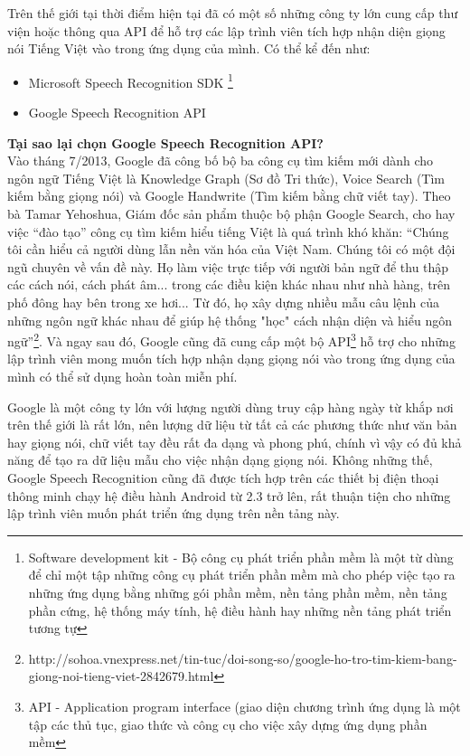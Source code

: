 \documentclass[12pt]{report}
\begin{document}
Trên thế giới tại thời điểm hiện tại đã có một số những công ty lớn cung cấp thư viện hoặc thông qua API để hỗ trợ các lập trình viên tích hợp nhận diện giọng nói Tiếng Việt vào trong ứng dụng của mình. Có thể kể đến như:

\begin{itemize}
	\item Microsoft Speech Recognition SDK \footnote{Software development kit - Bộ công cụ phát triển phần mềm là một từ dùng để chỉ một tập những công cụ phát triển phần mềm mà cho phép việc tạo ra những ứng dụng bằng những gói phần mềm, nền tảng phần mềm, nền tảng phần cứng, hệ thống máy tính, hệ điều hành hay những nền tảng phát triển tương tự}
	\item Google Speech Recognition API
\end{itemize}
\noindent \textbf{Tại sao lại chọn Google Speech Recognition API?}\\[0.3cm]
\noindent Vào tháng 7/2013, Google đã công bố bộ ba công cụ tìm kiếm mới dành cho ngôn ngữ Tiếng Việt là Knowledge Graph (Sơ đồ Tri thức), Voice Search (Tìm kiếm bằng giọng nói) và Google Handwrite (Tìm kiếm bằng chữ viết tay). Theo bà Tamar Yehoshua, Giám đốc sản phẩm thuộc bộ phận Google Search, cho hay việc ``đào tạo'' công cụ tìm kiếm hiểu tiếng Việt là quá trình khó khăn: ``Chúng tôi cần hiểu cả người dùng lẫn nền văn hóa của Việt Nam. Chúng tôi có một đội ngũ chuyên về vấn đề này. Họ làm việc trực tiếp với người bản ngữ để thu thập các cách nói, cách phát âm... trong các điều kiện khác nhau như nhà hàng, trên phố đông hay bên trong xe hơi... Từ đó, họ xây dựng nhiều mẫu câu lệnh của những ngôn ngữ khác nhau để giúp hệ thống "học" cách nhận diện và hiểu ngôn ngữ''{\footnote{http://sohoa.vnexpress.net/tin-tuc/doi-song-so/google-ho-tro-tim-kiem-bang-giong-noi-tieng-viet-2842679.html}}. Và ngay sau đó, Google cũng đã cung cấp một bộ API{\footnote{API - Application program interface (giao diện chương trình ứng dụng là một tập các thủ tục, giao thức và công cụ cho việc xây dựng ứng dụng phần mềm}} hỗ trợ cho những lập trình viên mong muốn tích hợp nhận dạng giọng nói vào trong ứng dụng của mình có thể sử dụng hoàn toàn miễn phí.

Google là một công ty lớn với lượng người dùng truy cập hàng ngày từ khắp nơi trên thế giới là rất lớn, nên lượng dữ liệu từ tất cả các phương thức như văn bản hay giọng nói, chữ viết tay đều rất đa dạng và phong phú, chính vì vậy có đủ khả năng để tạo ra dữ liệu mẫu cho việc nhận dạng giọng nói. Không những thế, Google Speech Recognition cũng đã được tích hợp trên các thiết bị điện thoại thông minh chạy hệ điều hành Android từ 2.3 trở lên, rất thuận tiện cho những lập trình viên muốn phát triển ứng dụng trên nền tảng này.
\end{document}
